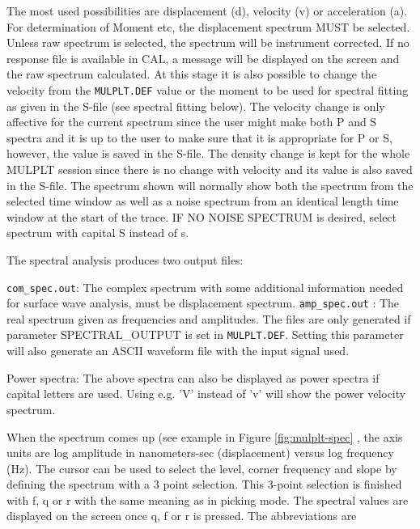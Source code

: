 The most used possibilities are displacement (d), velocity (v) or acceleration (a). For determination of Moment etc, the displacement spectrum MUST be selected. Unless raw spectrum is selected, the spectrum will be instrument corrected. If no response file is available in CAL, a message will be displayed on the screen and the raw spectrum calculated. At this stage it is also possible to change the velocity from the \texttt{MULPLT.DEF} value or the moment to be used for spectral fitting as given in the S-file (see spectral fitting below). The velocity change is only affective for the current spectrum since the user might make both P and S spectra and it is up to the user to make sure that it is appropriate for P or S, however, the value is saved in the S-file. The density change is kept for the whole MULPLT session since there is no change with velocity and its value is also saved in the S-file. The spectrum shown will normally show both the spectrum from the selected time window as well as a noise spectrum from an identical length time window at the start of the trace. IF NO NOISE SPECTRUM is desired, select spectrum with capital S instead of s.   


The spectral analysis produces two output files: 

\texttt{com\_spec.out}: The complex spectrum with some additional information 
needed for surface wave analysis, must 
be displacement spectrum.\newline
\texttt{amp\_spec.out} : The real spectrum given as frequencies and amplitudes. 
The files are only generated if parameter SPECTRAL\_OUTPUT is set 
in \texttt{MULPLT.DEF}. Setting this parameter will also generate 
an ASCII waveform file with the input signal used. 

Power spectra: The above spectra can also be displayed as power spectra if capital letters are used. Using e.g. 'V' instead of 'v' will show the power velocity spectrum. 

When the spectrum comes up (see example in Figure 
\ref{fig:mulplt-spec}
, the axis units are log amplitude in nanometers-sec (displacement) versus log frequency (Hz). The cursor can be used to select the level, corner frequency and slope by defining the spectrum with a 3 point selection.  This 3-point selection is finished with f, q or r with the same meaning as in picking mode. The spectral values are displayed on the screen once q, f or r is pressed. The abbreviations are 

